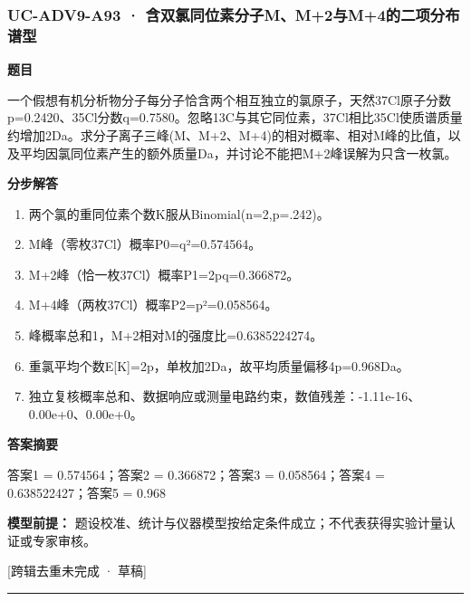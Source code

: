 \documentclass[UTF8,11pt,a4paper]{ctexart}
\begin{document}
\subsubsection*{UC-ADV9-A93 · 含双氯同位素分子M、M+2与M+4的二项分布谱型}
\noindent\textbf{题目}\par
一个假想有机分析物分子每分子恰含两个相互独立的氯原子，天然37Cl原子分数p=0.2420、35Cl分数q=0.7580。忽略13C与其它同位素，37Cl相比35Cl使质谱质量约增加2Da。求分子离子三峰(M、M+2、M+4)的相对概率、相对M峰的比值，以及平均因氯同位素产生的额外质量Da，并讨论不能把M+2峰误解为只含一枚氯。\par
\medskip\noindent\textbf{分步解答}
\begin{enumerate}
\item 两个氯的重同位素个数K服从Binomial(n=2,p=.242)。
\item M峰（零枚37Cl）概率P0=q²=0.574564。
\item M+2峰（恰一枚37Cl）概率P1=2pq=0.366872。
\item M+4峰（两枚37Cl）概率P2=p²=0.058564。
\item 峰概率总和1，M+2相对M的强度比=0.6385224274。
\item 重氯平均个数E[K]=2p，单枚加2Da，故平均质量偏移4p=0.968Da。
\item 独立复核概率总和、数据响应或测量电路约束，数值残差：-1.11e-16、0.00e+0、0.00e+0。
\end{enumerate}
\noindent\textbf{答案摘要}\par
答案1 = 0.574564；答案2 = 0.366872；答案3 = 0.058564；答案4 = 0.638522427；答案5 = 0.968\par
\noindent\textbf{模型前提：}
题设校准、统计与仪器模型按给定条件成立；不代表获得实验计量认证或专家审核。\par
\noindent\textcolor{red!65!black}{[跨辑去重未完成 · 草稿]} \par
\medskip\hrule\medskip
{}
\end{document}
